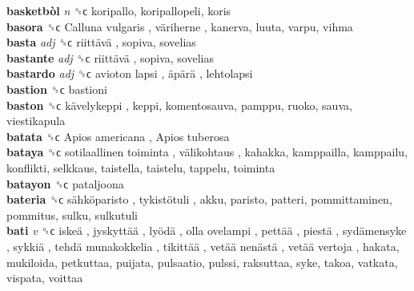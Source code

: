 \textbf{basketbòl} \emph{n}  ␝ϲ  koripallo, koripallopeli, koris  \\
\textbf{basora} ␝ϲ   Calluna vulgaris ,  väriherne , kanerva, luuta, varpu, vihma  \\
\textbf{basta} \emph{adj}  ␝ϲ   riittävä , sopiva, sovelias  \\
\textbf{bastante} \emph{adj}  ␝ϲ   riittävä , sopiva, sovelias  \\
\textbf{bastardo} \emph{adj}  ␝ϲ   avioton lapsi ,  äpärä , lehtolapsi  \\
\textbf{bastion} ␝ϲ  bastioni  \\
\textbf{baston} ␝ϲ   kävelykeppi , keppi, komentosauva, pamppu, ruoko, sauva, viestikapula  \\
\textbf{batata} ␝ϲ   Apios americana ,  Apios tuberosa   \\
\textbf{bataya} ␝ϲ   sotilaallinen toiminta ,  välikohtaus , kahakka, kamppailla, kamppailu, konflikti, selkkaus, taistella, taistelu, tappelu, toiminta  \\
\textbf{batayon} ␝ϲ  pataljoona  \\
\textbf{bateria} ␝ϲ   sähköparisto ,  tykistötuli , akku, paristo, patteri, pommittaminen, pommitus, sulku, sulkutuli  \\
\textbf{bati} \emph{v}  ␝ϲ   iskeä ,  jyskyttää ,  lyödä ,  olla ovelampi ,  pettää ,  piestä ,  sydämensyke ,  sykkiä ,  tehdä munakokkelia ,  tikittää ,  vetää nenästä ,  vetää vertoja , hakata, mukiloida, petkuttaa, puijata, pulsaatio, pulssi, raksuttaa, syke, takoa, vatkata, vispata, voittaa  \\
